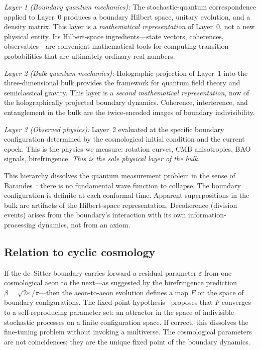 \documentclass[aps,prd,twocolumn,superscriptaddress,nofootinbib]{revtex4-2}
\begin{document}
\emph{Layer 1 (Boundary quantum mechanics):} The stochastic-quantum correspondence applied to Layer~0 produces a boundary Hilbert space, unitary evolution, and a density matrix. This layer is a \emph{mathematical representation} of Layer~0, not a new physical entity. Its Hilbert-space ingredients---state vectors, coherences, observables---are convenient mathematical tools for computing transition probabilities that are ultimately ordinary real numbers.

\emph{Layer 2 (Bulk quantum mechanics):} Holographic projection of Layer~1 into the three-dimensional bulk provides the framework for quantum field theory and semiclassical gravity. This layer is a \emph{second mathematical representation}, now of the holographically projected boundary dynamics. Coherence, interference, and entanglement in the bulk are the twice-encoded images of boundary indivisibility.

\emph{Layer 3 (Observed physics):} Layer~2 evaluated at the specific boundary configuration determined by the cosmological initial condition and the current epoch. This is the physics we measure: rotation curves, CMB anisotropies, BAO signals, birefringence. \emph{This is the sole physical layer of the bulk.}

This hierarchy dissolves the quantum measurement problem in the sense of Barandes~\cite{Barandes2025QSIP}: there is no fundamental wave function to collapse. The boundary configuration is definite at each conformal time. Apparent superpositions in the bulk are artifacts of the Hilbert-space representation. Decoherence (division events) arises from the boundary's interaction with its own information-processing dynamics, not from an axiom.

\subsection{Relation to cyclic cosmology}

If the de~Sitter boundary carries forward a residual parameter $\varepsilon$ from one cosmological aeon to the next---as suggested by the birefringence prediction $\beta = \sqrt{2\varepsilon}/\pi$---then the aeon-to-aeon evolution defines a map $F$ on the space of boundary configurations. The fixed-point hypothesis~\cite{PaperXI} proposes that $F$ converges to a self-reproducing parameter set: an attractor in the space of indivisible stochastic processes on a finite configuration space. If correct, this dissolves the fine-tuning problem without invoking a multiverse. The cosmological parameters are not coincidences; they are the unique fixed point of the boundary dynamics.
\end{document}
